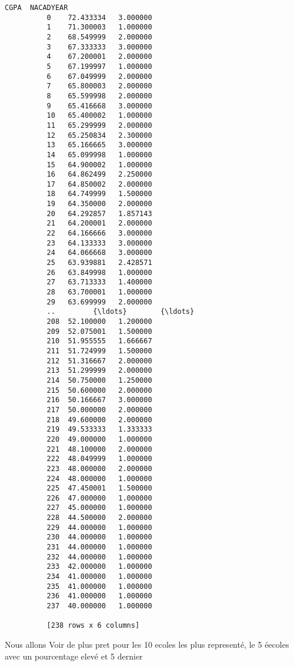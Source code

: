 \documentclass[11pt]{article}
\begin{document}
\begin{Verbatim}[commandchars=\\\{\}]
                    CGPA  NACADYEAR  
          0    72.433334   3.000000  
          1    71.300003   1.000000  
          2    68.549999   2.000000  
          3    67.333333   3.000000  
          4    67.200001   2.000000  
          5    67.199997   1.000000  
          6    67.049999   2.000000  
          7    65.800003   2.000000  
          8    65.599998   2.000000  
          9    65.416668   3.000000  
          10   65.400002   1.000000  
          11   65.299999   2.000000  
          12   65.250834   2.300000  
          13   65.166665   3.000000  
          14   65.099998   1.000000  
          15   64.900002   1.000000  
          16   64.862499   2.250000  
          17   64.850002   2.000000  
          18   64.749999   1.500000  
          19   64.350000   2.000000  
          20   64.292857   1.857143  
          21   64.200001   2.000000  
          22   64.166666   3.000000  
          23   64.133333   3.000000  
          24   64.066668   3.000000  
          25   63.939881   2.428571  
          26   63.849998   1.000000  
          27   63.713333   1.400000  
          28   63.700001   1.000000  
          29   63.699999   2.000000  
          ..         {\ldots}        {\ldots}  
          208  52.100000   1.200000  
          209  52.075001   1.500000  
          210  51.955555   1.666667  
          211  51.724999   1.500000  
          212  51.316667   2.000000  
          213  51.299999   2.000000  
          214  50.750000   1.250000  
          215  50.600000   2.000000  
          216  50.166667   3.000000  
          217  50.000000   2.000000  
          218  49.600000   2.000000  
          219  49.533333   1.333333  
          220  49.000000   1.000000  
          221  48.100000   2.000000  
          222  48.049999   1.000000  
          223  48.000000   2.000000  
          224  48.000000   1.000000  
          225  47.450001   1.500000  
          226  47.000000   1.000000  
          227  45.000000   1.000000  
          228  44.500000   2.000000  
          229  44.000000   1.000000  
          230  44.000000   1.000000  
          231  44.000000   1.000000  
          232  44.000000   1.000000  
          233  42.000000   1.000000  
          234  41.000000   1.000000  
          235  41.000000   1.000000  
          236  41.000000   1.000000  
          237  40.000000   1.000000  
          
          [238 rows x 6 columns]
\end{Verbatim}
        
    Nous allons Voir de plus pret pour les 10 ecoles les plus representé, le
5 éecoles avec un pourcentage elevé et 5 dernier
\end{document}
